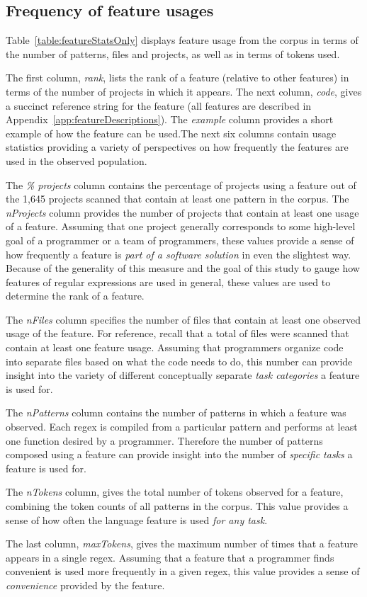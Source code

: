 \subsection{Frequency of feature usages}
\label{sec:featureResults}



Table~\ref{table:featureStatsOnly} displays feature usage from the corpus in terms of the number of patterns, files and projects, as well as in terms of tokens used.

The first column, \emph{rank}, lists the rank of a feature (relative to other features) in terms of the number of projects in which it appears. The next column, \emph{code}, gives a succinct reference string for the feature (all features are described in Appendix~\ref{app:featureDescriptions}). The \emph{example} column provides a short example of how the feature can be used.The next six columns contain usage statistics providing a variety of perspectives on how frequently the features are used in the observed population.

The \emph{\% projects} column contains the percentage of projects  using a feature out of the 1,645 projects scanned that contain at least one pattern in the corpus.  The \emph{nProjects} column provides the number of projects that contain at least one usage of a feature.  Assuming that one project generally corresponds to some high-level goal of a programmer or a team of programmers, these values provide a sense of how frequently a feature is \emph{part of a software solution} in even the slightest way.  Because of the generality of this measure and the goal of this study to gauge how features of regular expressions are used in general, these values are used to determine the rank of a feature.

The \emph{nFiles} column specifies the number of files that contain at least one observed usage of the feature.  For reference, recall that a total of  files were scanned that contain at least one feature usage.  Assuming that programmers organize code into separate files based on what the code needs to do, this number can provide insight into the variety of different conceptually separate \emph{task categories} a feature is used for.

The \emph{nPatterns} column contains the number of patterns in which a feature was observed. Each regex is compiled from a particular pattern and performs at least one function desired by a programmer.  Therefore the number of patterns composed using a feature can provide insight into the number of \emph{specific tasks} a feature is used for.

The \emph{nTokens} column, gives the total number of tokens observed for a feature, combining the token counts of all patterns in the corpus.  This value provides a sense of how often the language feature is used \emph{for any task}.

The last column, \emph{maxTokens}, gives the maximum number of times that a feature appears in a single regex.  Assuming that a feature that a programmer finds convenient is used more frequently in a given regex, this value provides a sense of \emph{convenience} provided by the feature.
